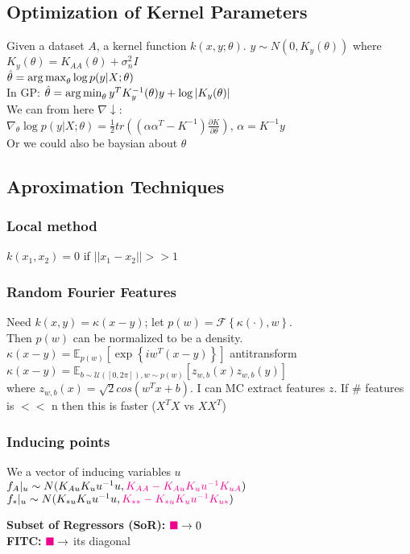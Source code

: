 \subsection{Optimization of Kernel Parameters}
Given a dataset $A$, a kernel function $k(x,y;\theta)$. $y\sim N(0, K_y(\theta))$ where $K_y(\theta)=K_{AA}(\theta)+\sigma_n^2I$\\
$\hat\theta = \operatorname*{arg\,max}_\theta \log p(y\vert X;\theta)$\\ 
In GP: $\hat\theta=\operatorname*{arg\,min}_\theta y^TK_{y}^{-1}(\theta)y + \log\vert K_y(\theta)\vert$\\
We can from here $\nabla\downarrow$:\\
$\nabla_\theta \log p(y\vert X;\theta) = ${\scriptsize$\frac{1}{2}tr\left(\left(\alpha\alpha^T-K^{-1}\right)\frac{\partial K}{\partial \theta}\right)$, $\alpha = K^{-1}y$}\\
Or we could also be baysian about $\theta$
\subsection{Aproximation Techniques}
\subsubsection{Local method} $k(x_1,x_2)= 0$ if $||x_1-x_2||>\!\!>1$

\subsubsection{Random Fourier Features} 
Need $k(x,y)=\kappa(x-y)$; let $p(w)=\mathcal{F}\left\{\kappa(\cdot), w\right\}$.\\ 
Then $p(w)$ can be normalized to be a density.\\
$\kappa(x-y) = \mathbb{E}_{p(w)}\left[\exp{\left\{iw^T(x-y)\right\}}\right]$ {\scriptsize antitransform}\\
$\kappa(x-y) = \mathbb{E}_{b\sim \mathcal{U}(\left[0, 2\pi\right]), w\sim p(w)}\left[z_{w,b}(x)z_{w,b}(y)\right]$\\
where $z_{w,b}(x)=\sqrt{2}cos(w^Tx+b)$. I can MC extract features $z$. If \# features is $<\!\!<$ n then this is faster ($X^TX$ vs $XX^T$)

\subsubsection{Inducing points} 
We a vector of inducing variables $u$\\
$f_A\vert_u \sim N(K_{Au}K_uu^{-1}u, \begingroup\color{magenta}K_{AA}-K_{Au}K_uu^{-1}K_{uA} \endgroup)$\\
$f_*\vert_u \sim N(K_{*u}K_uu^{-1}u, \begingroup\color{magenta}K_{**}-K_{*u}K_uu^{-1}K_{u*} \endgroup)$

\textbf{Subset of Regressors (SoR):} $\begingroup\color{magenta}\blacksquare\endgroup  \to 0$\\
\textbf{FITC:} $\begingroup\color{magenta}\blacksquare\endgroup  \to$ its diagonal
 
